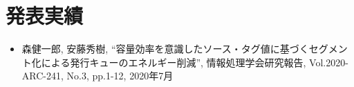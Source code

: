 
\chapter*{発表実績}
\begin{itemize}
  \item 森健一郎, 安藤秀樹, ``容量効率を意識したソース・タグ値に基づくセグメント化による発行キューのエネルギー削減'', 情報処理学会研究報告, Vol.2020-ARC-241, No.3, pp.1-12, 2020年7月
\end{itemize}

